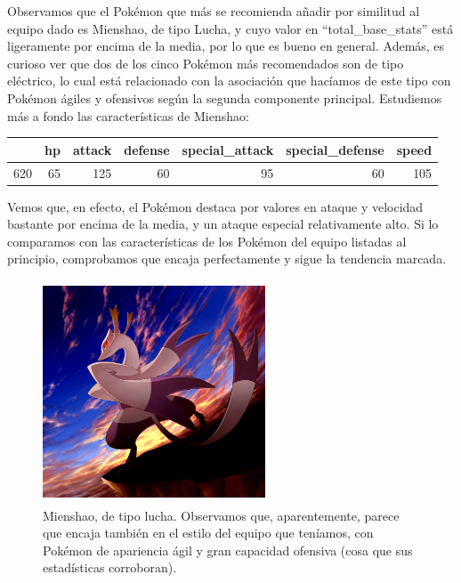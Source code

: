 \documentclass[
  11.8pt,
]{extreport}
\begin{document}
Observamos que el Pokémon que más se recomienda añadir por similitud al
equipo dado es Mienshao, de tipo Lucha, y cuyo valor en
``total\_base\_stats'' está ligeramente por encima de la media, por lo
que es bueno en general. Además, es curioso ver que dos de los cinco
Pokémon más recomendados son de tipo eléctrico, lo cual está relacionado
con la asociación que hacíamos de este tipo con Pokémon ágiles y
ofensivos según la segunda componente principal. Estudiemos más a fondo
las características de Mienshao:

\begin{table}[H]
\centering\begingroup\fontsize{11.5}{13.5}\selectfont

\begin{tabular}{lrrrrrr}
\toprule
  & hp & attack & defense & special\_attack & special\_defense & speed\\
\midrule
620 & 65 & 125 & 60 & 95 & 60 & 105\\
\bottomrule
\end{tabular}
\endgroup{}
\end{table}

Vemos que, en efecto, el Pokémon destaca por valores en ataque y
velocidad bastante por encima de la media, y un ataque especial
relativamente alto. Si lo comparamos con las características de los
Pokémon del equipo listadas al principio, comprobamos que encaja
perfectamente y sigue la tendencia marcada.

\begin{figure}[H]

{\centering \includegraphics[width=2.60417in,height=2.60417in]{trabajo_images/Mienshao.jpg}

}

\caption{Mienshao, de tipo lucha. Observamos que, aparentemente, parece
que encaja también en el estilo del equipo que teníamos, con Pokémon de
apariencia ágil y gran capacidad ofensiva (cosa que sus estadísticas
corroboran).}

\end{figure}%
\end{document}

